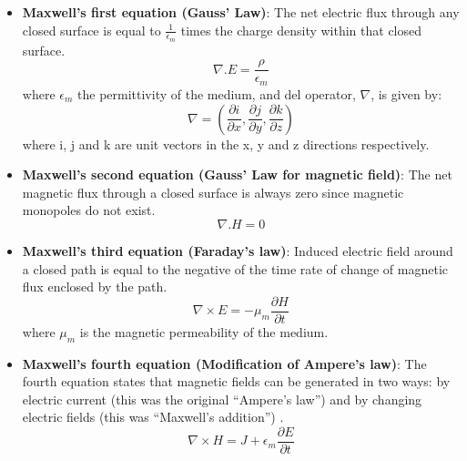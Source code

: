 \documentclass[../report.tex]{subfiles}
\begin{document}
\begin{itemize}	
	\item \textbf{Maxwell's first equation (Gauss' Law)}: The net electric flux through any closed surface is equal to $\frac{1}{\epsilon_m}$ times the charge density within that closed surface.
	\begin{equation}\label{eq:max1_1}
	\nabla.E = \frac{\rho}{\epsilon_m}	
	\end{equation}
	where $\epsilon_m$ the permittivity of the medium, and del operator, $\nabla$, is given by:
	\begin{equation}\label{eq:max1_2}
	\nabla = \left(\frac{\partial i}{\partial x},\frac{\partial j}{\partial y},\frac{\partial k}{\partial z}\right)
	\end{equation}
	where i, j and k are unit vectors in the x, y and z directions respectively.
	
	\item \textbf{Maxwell's second equation (Gauss' Law for magnetic field)}: The net magnetic flux through a closed surface is always zero since magnetic monopoles do not exist.
	\begin{equation}\label{eq:max1_3}
	\nabla.H = 0	
	\end{equation}
	
	\item \textbf{Maxwell's third equation (Faraday's law)}: Induced electric field around a closed path is equal to the negative of the time rate of change of magnetic flux enclosed by the path.
	\begin{equation}\label{eq:max1_4}
	\nabla\times E = -\mu_m\frac{\partial H}{\partial t}
	\end{equation}
	where $\mu_m$ is the magnetic permeability of the medium.

	\item \textbf{Maxwell's fourth equation (Modification of Ampere's law)}:  The fourth equation states that magnetic fields can be generated in two ways: by electric current (this was the original “Ampere's law”) and by changing electric fields (this was “Maxwell's addition”) \cite{wiki_maxwells_2016}.
	\begin{equation}\label{eq:max1_5}
	\nabla\times H =  J + \epsilon_m\frac{\partial E}{\partial t}	
	\end{equation}	
\end{itemize}
\end{document}
